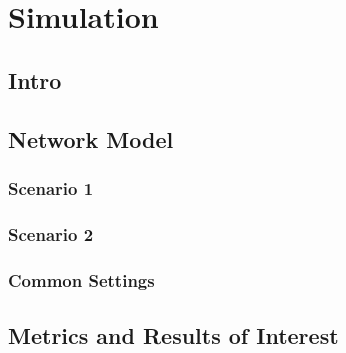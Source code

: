 \chapter{Simulation}

\section{Intro}


\section{Network Model}


\subsection{Scenario 1}


\subsection{Scenario 2}


\subsection{Common Settings}



\section{Metrics and Results of Interest }

